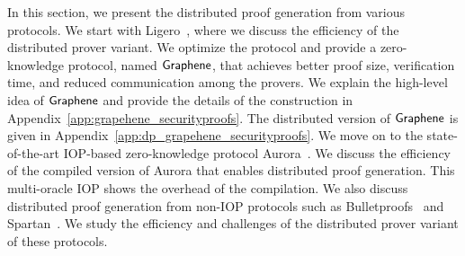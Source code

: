 In this section, we present the distributed proof generation from various protocols. We start with Ligero~\cite{ligero}, where we discuss the efficiency of the distributed prover variant. We optimize the protocol and provide a zero-knowledge protocol, named $\textsf{Graphene}$, that achieves better proof size, verification time, and reduced communication among the provers. We explain the high-level idea of $\textsf{Graphene}$ and provide the details of the construction in Appendix~\ref{app:grapehene_securityproofs}. The distributed version of $\textsf{Graphene}$ is given in Appendix~\ref{app:dp_grapehene_securityproofs}.
We move on to the state-of-the-art IOP-based zero-knowledge protocol Aurora~\cite{aurora}. We discuss the efficiency of the compiled version of Aurora that enables distributed proof generation. This multi-oracle IOP shows the overhead of the compilation. 
We also discuss distributed proof generation from non-IOP protocols such as Bulletproofs~\cite{bulletproofs} and Spartan~\cite{spartan}. We study the efficiency and challenges of the distributed prover variant of these protocols. 



